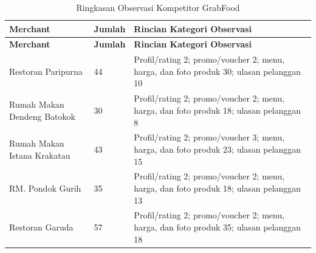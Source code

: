 \begingroup
\footnotesize
\begin{xltabular}{\textwidth}{|Z{3.4cm}|C{1.2cm}|Y|}
\caption{Ringkasan Observasi Kompetitor GrabFood}
\label{tab:ringkasan-observasi-kompetitor-grabfood-20260619} \\
        \toprule
        \textbf{Merchant} & \textbf{Jumlah} & \textbf{Rincian Kategori Observasi} \\ \hline
        \midrule
\endfirsthead
{}
        \toprule
        \textbf{Merchant} & \textbf{Jumlah} & \textbf{Rincian Kategori Observasi} \\ \hline
        \midrule
\endhead
{}
\endfoot
        \bottomrule
        \endlastfoot
        Restoran Paripurna & 44 & Profil/rating 2; promo/voucher 2; menu, harga, dan foto produk 30; ulasan pelanggan 10 \\ \hline
        Rumah Makan Dendeng Batokok & 30 & Profil/rating 2; promo/voucher 2; menu, harga, dan foto produk 18; ulasan pelanggan 8 \\ \hline
        Rumah Makan Istana Krakatau & 43 & Profil/rating 2; promo/voucher 3; menu, harga, dan foto produk 23; ulasan pelanggan 15 \\ \hline
        RM. Pondok Gurih & 35 & Profil/rating 2; promo/voucher 2; menu, harga, dan foto produk 18; ulasan pelanggan 13 \\ \hline
        Restoran Garuda & 57 & Profil/rating 2; promo/voucher 2; menu, harga, dan foto produk 35; ulasan pelanggan 18 \\ \hline
        \bottomrule
    
\end{xltabular}
\endgroup

